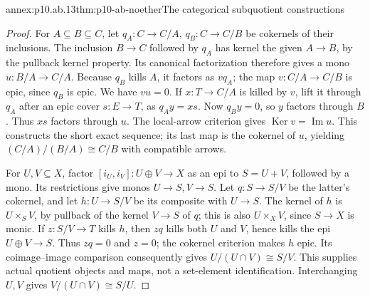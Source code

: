 \begin{annexitem}{annex:p10.ab.13}{thm:p10-ab-noether}{The categorical subquotient constructions}
\begin{proof}
For \(A\subseteq B\subseteq C\), let
\(q_A:C\to C/A\), \(q_B:C\to C/B\) be cokernels of their
inclusions. The inclusion \(B\to C\) followed by \(q_A\) has kernel
the given \(A\to B\), by the pullback kernel property. Its canonical
factorization therefore gives a mono \(u:B/A\to C/A\).
Because \(q_B\) kills \(A\), it factors as \(v q_A\); the map
\(v:C/A\to C/B\) is epic, since \(q_B\) is epic.
We have \(vu=0\). If \(x:T\to C/A\) is killed by \(v\), lift
it through \(q_A\) after an epic cover \(s:E\to T\), as
\(q_Ay=xs\). Now \(q_By=0\), so \(y\) factors through \(B\).
Thus \(xs\) factors through \(u\). The local-arrow criterion gives
\(\operatorname{Ker}v=\operatorname{Im}u\). This constructs the
short exact sequence; its last map is the cokernel of \(u\), yielding
\((C/A)/(B/A)\cong C/B\) with compatible arrows.

For \(U,V\subseteq X\), factor
\([i_U,i_V]:U\oplus V\to X\) as an epi to \(S=U+V\), followed
by a mono. Its restrictions give monos \(U\to S,V\to S\).
Let \(q:S\to S/V\) be the latter's cokernel, and let
\(h:U\to S/V\) be its composite with \(U\to S\).
The kernel of \(h\) is \(U\times_SV\), by pullback of the kernel
\(V\to S\) of \(q\); this is also \(U\times_XV\), since
\(S\to X\) is monic.
If \(z:S/V\to T\) kills \(h\), then \(zq\) kills both \(U\)
and \(V\), hence kills the epi \(U\oplus V\to S\). Thus
\(zq=0\) and \(z=0\); the cokernel criterion makes \(h\) epic.
Its coimage--image comparison consequently gives
\(U/(U\cap V)\cong S/V\). This supplies actual quotient objects
and maps, not a set-element identification.
Interchanging \(U,V\) gives \(V/(U\cap V)\cong S/U\).


\end{proof}
\end{annexitem}
